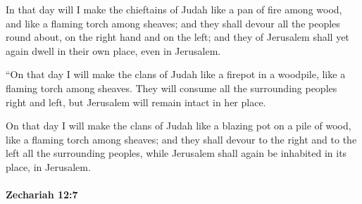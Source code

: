 			\begin{versebox}
					\item[BHS] 
					\item[LXX] 
					\item[ASV] In that day will I make the chieftains of Judah like a pan of fire among wood, and like a flaming torch among sheaves; and they shall devour all the peoples round about, on the right hand and on the left; and they of Jerusalem shall yet again dwell in their own place, even in Jerusalem.
					\item[NIV] “On that day I will make the clans of Judah like a firepot in a woodpile, like a flaming torch among sheaves. They will consume all the surrounding peoples right and left, but Jerusalem will remain intact in her place.
					\item[NRSV] On that day I will make the clans of Judah like a blazing pot on a pile of wood, like a flaming torch among sheaves; and they shall devour to the right and to the left all the surrounding peoples, while Jerusalem shall again be inhabited in its place, in Jerusalem.
			\end{versebox}

		\paragraph{Zechariah 12:7} %
			\label{ZECHARIAH-12-7}

